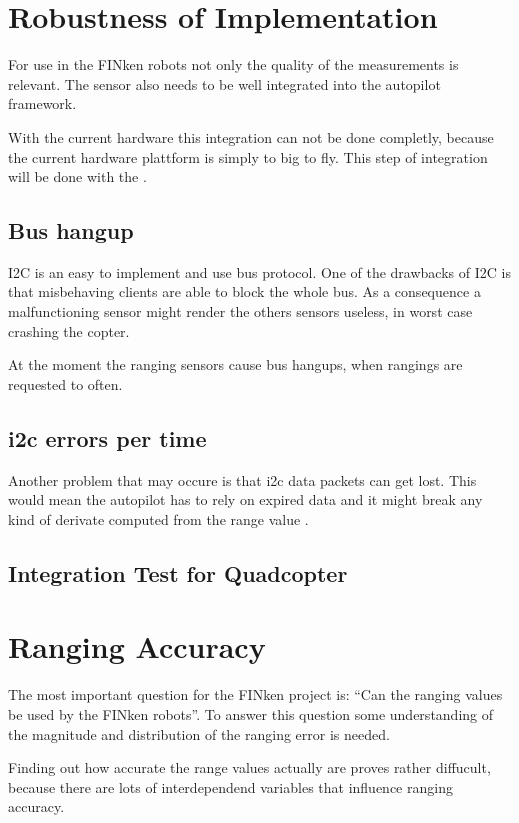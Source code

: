 
\section{Robustness of Implementation}

For use in the FINken robots not only the quality of the measurements is relevant.
The sensor also needs to be well integrated into the autopilot framework.

With the current hardware this integration can not be done completly, because the current hardware plattform is simply to big to fly.
This step of integration will be done with the .

\subsection{Bus hangup}
I2C is an easy to implement and use bus protocol.
One of the drawbacks of I2C is that misbehaving clients are able to block the whole bus.
As a consequence a malfunctioning sensor might render the others sensors useless, in worst case crashing the copter.

At the moment the ranging sensors cause bus hangups, when rangings are requested to often.

\subsection{i2c errors per time}
Another problem that may occure is that i2c data packets can get lost.
This would mean the autopilot has to rely on expired data and it might break any kind of derivate computed from the range value .

\subsection{Integration Test for Quadcopter}


\section{Ranging Accuracy}

The most important question for the FINken project is: \enquote{Can the ranging values be used by the FINken robots}.
To answer this question some understanding of the magnitude and distribution of the ranging error is needed.

Finding out how accurate the range values actually are proves rather diffucult, because there are lots of interdependend variables that influence ranging accuracy.

